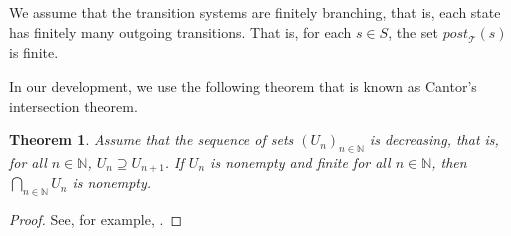 \documentclass[12pt]{article}
\newtheorem{theorem}{Theorem}
\theoremstyle{definition}
\begin{document}
We assume that the transition systems are finitely branching, that is, each state has finitely many outgoing transitions.  That is, for each $s \in S$, the set $\mathit{post}_{\mathcal{T}}(s)$ is finite.

In our development, we use the following theorem that is known as Cantor's intersection theorem.

\begin{theorem}
\label{theorem:cantor}
Assume that the sequence of sets $(U_n)_{n \in \mathbb{N}}$ is decreasing, that is, for all $n \in \mathbb{N}$, $U_n \supseteq U_{n+1}$.  If $U_n$ is nonempty and finite for all $n \in \mathbb{N}$, then $\bigcap_{n \in \mathbb{N}} U_n$ is nonempty.
\end{theorem}
\begin{proof}
See, for example, \cite[Theorem~4.3.9]{E89}.
\end{proof}
\end{document}
